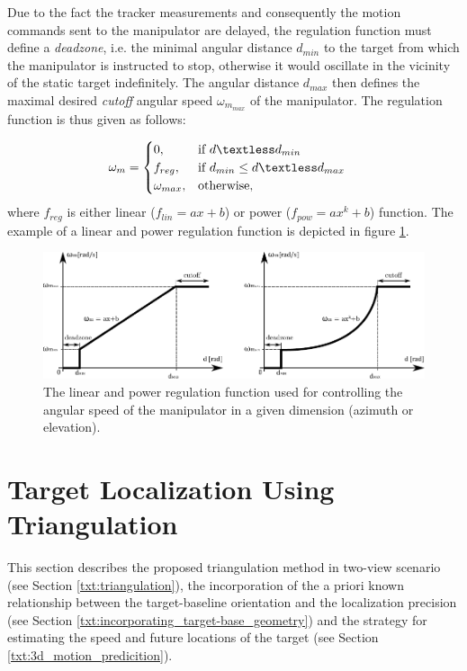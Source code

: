 Due to the fact the tracker measurements and consequently the motion commands sent to the manipulator are delayed, the regulation function must define a \textit{deadzone}, i.e. the minimal angular distance $d_{min}$ to the target from which the manipulator is instructed to stop, otherwise it would oscillate in the vicinity of the static target indefinitely. The angular distance $d_{max}$ then defines the maximal desired \textit{cutoff} angular speed $\omega_{m_{max}}$ of the manipulator. The regulation function is thus given as follows:

\begin{align}
	\omega_{m} &=
	\begin{cases}
		0,  & \text{if}\ d \textless d_{min}\\
		f_{reg},  & \text{if}\ d_{min} \leq d \textless d_{max}\\
		\omega_{max}, & \text{otherwise},
	\end{cases}
\end{align}
where $f_{reg}$ is either linear ($f_{lin} = ax+b$) or power ($f_{pow} = ax^{k}+b$) function. The example of a linear and power regulation function is depicted in figure \ref{fig:regulation_lin_power}.

\begin{figure}[htb]
	\centering
	\includegraphics[width=0.75\linewidth]{fig/regulation_linear_power.pdf}
	\caption{The linear and power regulation function used for controlling the angular speed of the manipulator in a given dimension (azimuth or elevation).}
	\label{fig:regulation_lin_power}
\end{figure}

\section{Target Localization Using Triangulation} \label{txt:target_localization_using_triangulation}

This section describes the proposed triangulation method in two-view scenario (see Section \ref{txt:triangulation}), the incorporation of the a priori known relationship between the target-baseline orientation and the localization precision (see Section \ref{txt:incorporating_target-base_geometry}) and the strategy for estimating the speed and future locations of the target (see Section \ref{txt:3d_motion_predicition}).

